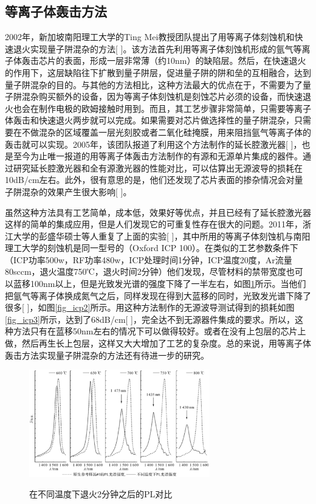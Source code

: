 \documentclass{ZJUthesis}
\begin{document}
\subsection{等离子体轰击方法}

2002年，新加坡南阳理工大学的Ting Mei教授团队提出了用等离子体刻蚀机和快速退火实现量子阱混杂的方法[ ]。该方法首先利用等离子体刻蚀机形成的氩气等离子体轰击芯片的表面，形成一层非常薄（约10nm）的缺陷层。然后，在快速退火的作用下，这层缺陷往下扩散到量子阱层，促进量子阱的阱和垒的互相融合，达到量子阱混杂的目的。与其他的方法相比，这种方法最大的优点在于，不需要为了量子阱混杂购买额外的设备，因为等离子体刻蚀机是刻蚀芯片必须的设备，而快速退火也会在制作电极的欧姆接触时用到。而且，其工艺步骤非常简单，只需要等离子体轰击和快速退火两步就可以完成。如果需要对芯片做选择性的量子阱混杂，只需要在不做混杂的区域覆盖一层光刻胶或者二氧化硅掩膜，用来阻挡氩气等离子体的轰击就可以实现。2005年，该团队报道了利用这个方法制作的延长腔激光器[ ]，也是至今为止唯一报道的用等离子体轰击方法制作的有源和无源单片集成的器件。通过研究延长腔激光器和全有源激光器的性能对比，可以估算出无源波导的损耗在10dB/cm左右。此外，很有意思的是，他们还发现了芯片表面的掺杂情况会对量子阱混杂的效果产生很大影响[ ]。

虽然这种方法具有工艺简单，成本低，效果好等优点，并且已经有了延长腔激光器这样的简单的集成应用，但是人们发现它的可重复性存在很大的问题。2011年，浙江大学的彭盛华硕士等人重复了上面的实验[ ]，其中所用的等离子体刻蚀机与南阳理工大学的刻蚀机是同一型号的（Oxford ICP 100）。在类似的工艺参数条件下（ICP功率500w，RF功率480w，ICP处理时间1分钟，ICP温度20度，Ar流量80sccm，退火温度750℃，退火时间2分钟）他们发现，尽管材料的禁带宽度也可以蓝移100nm以上，但是光致发光谱的强度下降了一半左右，如图\ref{fig_icp}所示。当他们把氩气等离子体换成氮气之后，同样发现在得到大蓝移的同时，光致发光谱下降了很多[ ]，如图\ref{fig_icp2}所示。用这种方法制作的无源波导测试得到的损耗如图\ref{fig_icp3}所示，达到了68dB/cm[ ]，完全达不到无源器件集成的要求。所以，这种方法只有在蓝移50nm左右的情况下可以做得较好。或者在没有上包层的芯片上做，然后再生长上包层，这样又大大增加了工艺的复杂度。总的来说，用等离子体轰击方法实现量子阱混杂的方法还有待进一步的研究。

\begin{figure}[!ht]
  \centering
  \includegraphics[width=0.7\textwidth]{./Pictures/icp.eps}\\
  \caption{在不同温度下退火2分钟之后的PL对比}
  \label{fig_icp}
\end{figure}
\end{document}
